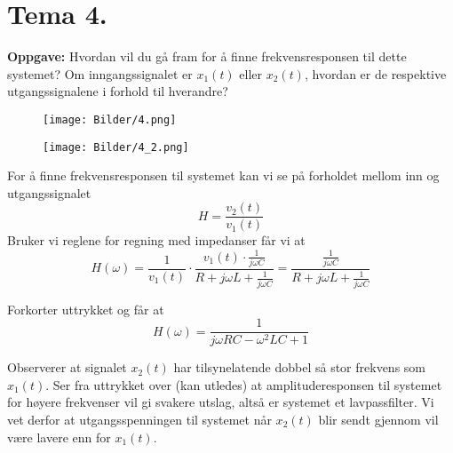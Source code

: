 \documentclass[a4paper,11pt,norsk]{article}
\begin{document}
\section{Tema 4.}
\begin{question}
    \textbf{Oppgave:}
        Hvordan vil du gå fram for å finne frekvensresponsen til dette systemet?
        Om inngangssignalet er $x_1(t)$ eller $x_2(t)$, hvordan er de respektive
        utgangssignalene i forhold til hverandre?
        
        \begin{figure}[H]
            \centering 
            \begin{minipage}{0.3\textwidth}
                \texttt{[image: Bilder/4.png]}
            \end{minipage}
            \begin{minipage}{0.3\textwidth}
                \texttt{[image: Bilder/4\_2.png]}
            \end{minipage}
        \end{figure}
\end{question}
For å finne frekvensresponsen til systemet kan vi se på forholdet mellom inn 
og utgangssignalet
\[
    H = \frac{v_2(t)}{v_1(t)}
\]
Bruker vi reglene for regning med impedanser får vi at
\[
    H(\omega) = \frac{1}{v_1(t)} \cdot \frac{v_1(t) \cdot \frac{1}{j\omega C}}{R + j\omega L + \frac{1}{j\omega C}} = \frac{\frac{1}{j\omega C}}{R + j\omega L + \frac{1}{j\omega C}}
\]

Forkorter uttrykket og får at
\[
    H(\omega) = \frac{1}{j\omega RC - \omega^2 LC + 1}
\]

Observerer at signalet $x_2(t)$ har tilsynelatende dobbel så stor frekvens som $x_1(t)$. 
Ser fra uttrykket over (kan utledes) at amplituderesponsen til systemet for høyere frekvenser 
vil gi svakere utslag, altså er systemet et lavpassfilter. Vi vet derfor at utgangsspenningen til systemet 
når $x_2(t)$ blir sendt gjennom vil være lavere enn for $x_1(t)$.

\newpage
\end{document}
